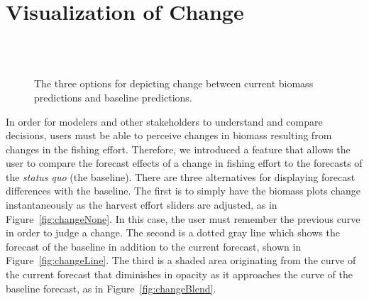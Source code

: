 \section{Visualization of Change}

\begin{figure}
\centering

 \\ 

 \\ 


	\caption[The three options for depicting change between current biomass predictions and baseline predictions]{The three options for depicting change between current biomass predictions and baseline predictions.}
	\label{fig:changeTypes}
\end{figure}

In order for modelers and other stakeholders to understand and compare decisions, users must be able to perceive changes in biomass resulting from changes in the fishing effort.  Therefore, we introduced a feature that allows the user to compare the forecast effects of a change in fishing effort to the forecasts of the \textit{status quo} (the baseline). There are three alternatives for displaying forecast differences with the baseline.  The first is to simply have the biomass plots change instantaneously as the harvest effort sliders are adjusted, as in Figure~\ref{fig:changeNone}.  In this case, the user must remember the previous curve in order to judge a change.  The second is a dotted gray line which shows the forecast of the baseline in addition to the current forecast, shown in Figure~\ref{fig:changeLine}.  The third is a shaded area originating from the curve of the current forecast that diminishes in opacity as it approaches the curve of the baseline forecast, as in Figure~\ref{fig:changeBlend}.

